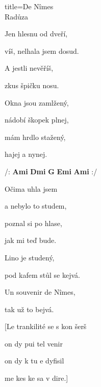 \begin{song}{title=\predtitle\centering De N\^{i}mes \\\large Radůza  \vspace*{-0.3cm}}
\begin{centerjustified}
\begin{varwidth}[t]{0.48\textwidth}
\sloka
	Jen hlesnu od dveří,
	
	víš, nelhala jsem dosud.

	A jestli nevěříš,
	
	zkus špičku nosu.

	Okna jsou zamlžený,

	nádobí škopek plnej,

	mám hrdlo stažený,
	
	hajej a nynej.



\phantom{.}


/: \textbf{Ami\,\,Dmi\,\,G\,\,Emi\,\,Ami} :/
       

\sloka
	Očima uhla jsem
	
	a nebylo to studem,
	
	poznal si po hlase,

	jak mi teď bude.
	
	Lino je studený,

	pod kafem stůl se kejvá.
	
	Un souvenir de N\^{i}mes,
	
	tak už to bejvá.





\end{varwidth}
\end{centerjustified}

\vspace*{1.5cm}
\begin{centerjustified}
\begin{varwidth}[t]{0.48\textwidth}\setlength{\parindent}{0.45cm}  %

\end{varwidth}\begin{varwidth}[t]{0.48\textwidth}\setlength{\parindent}{0.45cm}%
\ssloka{}
[Le trankilité se s kon šerš

  on dy pui tel venir

  on dy k tu e dyfisil

  me kes ke sa v dire.]
\end{varwidth}

\end{centerjustified}
\setcounter{Slokočet}{0}
\end{song}
